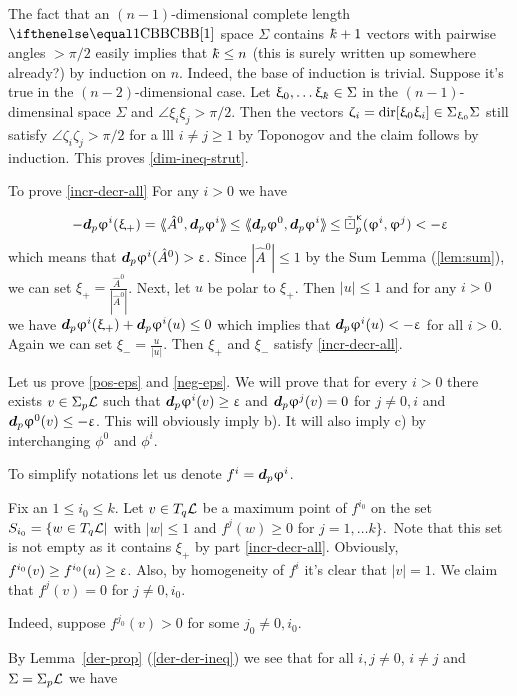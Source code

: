  The fact that   an $(n-1)$-dimensional complete length $\Alex{1}$ space $\Sigma$ contains $\kay+1$ vectors with pairwise angles $>\pi/2$ easily  implies that $\kay\le n$ (this is surely written up somewhere already?) by induction on $n$. 
 Indeed, the base of induction is trivial. 
 Suppose it's true in the $(n-2)$-dimensional case.
 Let $\xi_0,\ldots \xi_\kay\in \Sigma$ in the $(n-1)$-dimensinal space  $\Sigma$  and $\angle \xi_i\xi_j>\pi/2$.  
 Then the vectors $\zeta_i=\dir{\xi_0}{\xi_i}\in\Sigma_{\xi_0}\Sigma$ still satisfy $\angle \zeta_i\zeta_j>\pi/2$ for a lll $i\ne j\ge 1$ by Toponogov and the claim follows by induction. 
 This proves \eqref{dim-ineq-strut}.
 
 To prove \eqref{incr-decr-all} For any $i>0$ we have
 
  \[
-\d_p\phi^i(\xi_+)=\dlang \hat A^0, \d_p\phi^i\drang\le \dlang \d_p\phi^0, \d_p\phi^i\drang\le \sdk\kappa{p}{\phi^i}{\phi^j}<-\eps
\]
 which means  that $\bm{d}_p\upvarphi^i( \hat A^0)>\upvarepsilon$. Since $|\hat A^0|\le 1$ by the Sum Lemma (\ref{lem:sum}), we can set $\xi_+=\frac{\hat A^0}{|\hat A^0|}$.
 Next, let $u$ be polar to $\xi_+$. Then $|u|\le 1$ and  for any $i>0$ we have $\d_p\phi^i(\xi_+)+\d_p\phi^i(u)\le 0$ which implies that $\bm{d}_p\upvarphi^i(u)< -\upvarepsilon$ for all $i>0$. Again we can set $\xi_-=\frac{u}{|u|}$. Then $\xi_+$ and $\xi_-$  satisfy \eqref{incr-decr-all}.
 
 
 Let us prove \eqref{pos-eps} and \eqref{neg-eps}. We will prove that for every $i>0$ there exists $v\in \Sigma_p\spc{L}$ such that $\d_p\phi^i(v)\ge \eps$ and $\bm{d}_p\upvarphi^j(v)=0$ for $j\ne 0, i$ and  $\d_p\phi^0(v)\le- \eps$.
 This will obviously  imply b). It  will  also imply  c) by interchanging $\phi^0$ and $\phi^i$.
 
To simplify notations let us denote $f^i=\bm{d}_p\upvarphi^i$.
 

 

Fix an $1\le i_0\le k$. Let $v\in T_q\spc{L}$ be a maximum point of $f^{i_0}$ on the set $S_{i_0}=\{w\in T_q\spc{L} | $ with $|w|\le 1$ and $ f^j(w)\ge 0$ for $j=1,\ldots k\}$.\
Note that this set is not empty as it contains $\xi_+$ by part  \eqref{incr-decr-all}. Obviously, $f^{i_0}(v)\ge f^{i_0}(u)\ge \eps$. Also,  by homogeneity of $f^i$  it's clear that $|v|=1$.
We claim that $f^j(v)=0$ for $j\ne 0,i_0$.

Indeed, suppose $f^{j_0}(v)>0$ for some $j_0\ne 0,i_0$.



By Lemma~\ref{der-prop} (\ref{der-der-ineq}) we see that for all  $i,j\ne 0$, $i\ne j$ and $\Sigma=\Sigma_p\mathcal{L}$ we have

